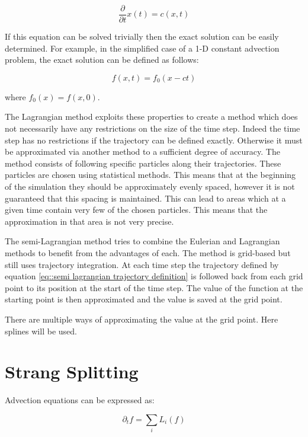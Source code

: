 \begin{equation}\label{eq::semi lagrangian trajectory definition}
 \frac{\partial}{\partial t}x(t) = c(x,t)
\end{equation}

If this equation can be solved trivially then the exact solution can be easily determined. For example, in the simplified case of a 1-D constant advection problem, the exact solution can be defined as follows:

\begin{equation}
 f(x,t) = f_0(x-ct)
\end{equation}

where $f_0(x)=f(x,0)$.

The Lagrangian method exploits these properties to create a method which does not necessarily have any restrictions on the size of the time step. Indeed the time step has no restrictions if the trajectory can be defined exactly. Otherwise it must be approximated via another method to a sufficient degree of accuracy. The method consists of following specific particles along their trajectories. These particles are chosen using statistical methods. This means that at the beginning of the simulation they should be approximately evenly spaced, however it is not guaranteed that this spacing is maintained. This can lead to areas which at a given time contain very few of the chosen particles. This means that the approximation in that area is not very precise.

The semi-Lagrangian method tries to combine the Eulerian and Lagrangian methods to benefit from the advantages of each. The method is grid-based but still uses trajectory integration. At each time step the trajectory defined by equation \ref{eq::semi lagrangian trajectory definition} is followed back from each grid point to its position at the start of the time step. The value of the function at the starting point is then approximated and the value is saved at the grid point.

There are multiple ways of approximating the value at the grid point. Here splines will be used.

\section{Strang Splitting} \label{sec::Strang}

Advection equations can be expressed as:

\begin{equation}
 \partial_t f = \sum_i L_i(f)
\end{equation}

